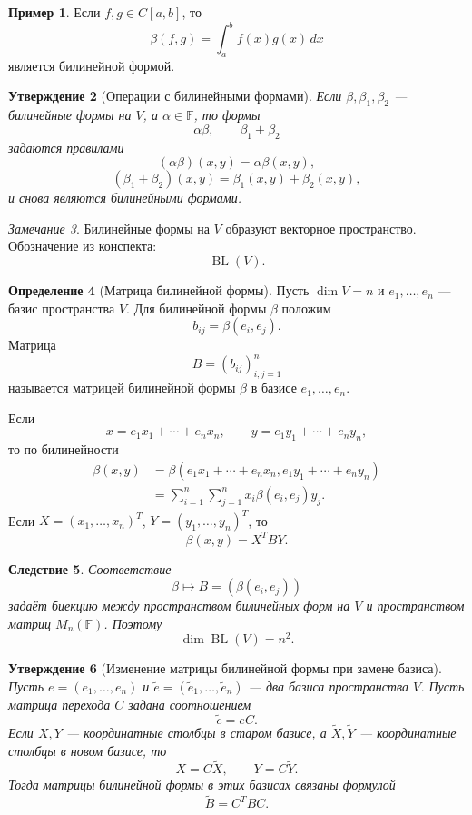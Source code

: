 \documentclass[12pt,a4paper]{article}
\theoremstyle{definition}
\newtheorem{definition}{Определение}[section]
\newtheorem{example}[definition]{Пример}
\theoremstyle{plain}
\newtheorem{proposition}[definition]{Утверждение}
\newtheorem{corollary}[definition]{Следствие}
\theoremstyle{remark}
\newtheorem{remark}[definition]{Замечание}
\newcommand{\F}{\mathbb{F}}
\newcommand{\BL}{\operatorname{BL}}
\begin{document}
\begin{example}
Если $f,g\in C[a,b]$, то
\[
    \beta(f,g)=\int_a^b f(x)g(x)\,dx
\]
является билинейной формой.
\end{example}


\begin{proposition}[Операции с билинейными формами]
Если $\beta,\beta_1,\beta_2$ --- билинейные формы на $V$, а $\alpha\in\F$, то формы
\[
    \alpha\beta,
    \qquad
    \beta_1+\beta_2
\]
задаются правилами
\[
    (\alpha\beta)(x,y)=\alpha\beta(x,y),
\]
\[
    (\beta_1+\beta_2)(x,y)=\beta_1(x,y)+\beta_2(x,y),
\]
и снова являются билинейными формами.
\end{proposition}

\begin{remark}
Билинейные формы на $V$ образуют векторное пространство.
Обозначение из конспекта:
\[
    \BL(V).
\]
\end{remark}

\begin{definition}[Матрица билинейной формы]
Пусть $\dim V=n$ и $e_1,\ldots,e_n$ --- базис пространства $V$.
Для билинейной формы $\beta$ положим
\[
    b_{ij}=\beta(e_i,e_j).
\]
Матрица
\[
    B=(b_{ij})_{i,j=1}^n
\]
называется матрицей билинейной формы $\beta$ в базисе $e_1,\ldots,e_n$.
\end{definition}

Если
\[
    x=e_1x_1+\cdots+e_nx_n,\qquad
    y=e_1y_1+\cdots+e_ny_n,
\]
то по билинейности
\[
\begin{aligned}
    \beta(x,y)
    &=\beta(e_1x_1+\cdots+e_nx_n,
             e_1y_1+\cdots+e_ny_n) \\
    &=\sum_{i=1}^n\sum_{j=1}^n x_i\beta(e_i,e_j)y_j.
\end{aligned}
\]
Если $X=(x_1,\ldots,x_n)^T$, $Y=(y_1,\ldots,y_n)^T$, то
\[
    \beta(x,y)=X^TBY.
\]

\begin{corollary}
Соответствие
\[
    \beta \longmapsto B=(\beta(e_i,e_j))
\]
задаёт биекцию между пространством билинейных форм на $V$ и пространством матриц $M_n(\F)$.
Поэтому
\[
    \dim \BL(V)=n^2.
\]
\end{corollary}


\begin{proposition}[Изменение матрицы билинейной формы при замене базиса]
Пусть $e=(e_1,\ldots,e_n)$ и $\widetilde e=(\widetilde e_1,\ldots,\widetilde e_n)$ --- два базиса пространства $V$.
Пусть матрица перехода $C$ задана соотношением
\[
    \widetilde e = eC.
\]
Если $X,Y$ --- координатные столбцы в старом базисе, а $\widetilde X,\widetilde Y$ --- координатные столбцы в новом базисе, то
\[
    X=C\widetilde X,
    \qquad
    Y=C\widetilde Y.
\]
Тогда матрицы билинейной формы в этих базисах связаны формулой
\[
    \widetilde B=C^TBC.
\]
\end{proposition}
\end{document}
